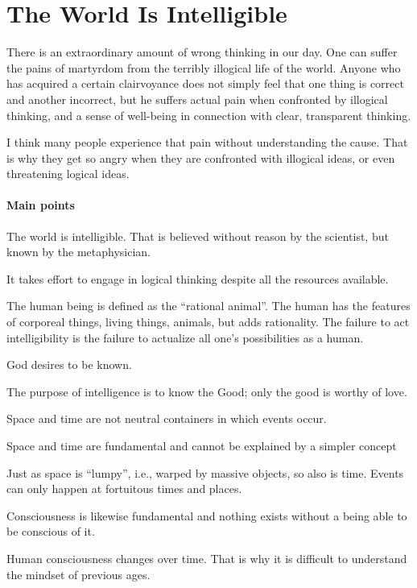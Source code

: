 \section{The World Is Intelligible}

\begin{quotex}
There is an extraordinary amount of wrong thinking in our day. One can suffer the pains of martyrdom from the terribly illogical life of the world. Anyone who has acquired a certain clairvoyance does not simply feel that one thing is correct and another incorrect, but he suffers actual pain when confronted by illogical thinking, and a sense of well-being in connection with clear, transparent thinking.
\end{quotex}

I think many people experience that pain without understanding the cause. That is why they get so angry when they are confronted with illogical ideas, or even threatening logical ideas.

\paragraph{Main points}

The world is intelligible. That is believed without reason by the scientist, but known by the metaphysician.

It takes effort to engage in logical thinking despite all the resources available.

The human being is defined as the ``rational animal''. The human has the features of corporeal things, living things, animals, but adds rationality. The failure to act intelligibility is the failure to actualize all one's possibilities as a human.

God desires to be known.

The purpose of intelligence is to know the Good; only the good is worthy of love.

Space and time are not neutral containers in which events occur.

Space and time are fundamental and cannot be explained by a simpler concept

Just as space is ``lumpy'', i.e., warped by massive objects, so also is time. Events can only happen at fortuitous times and places.

Consciousness is likewise fundamental and nothing exists without a being able to be conscious of it.

Human consciousness changes over time. That is why it is difficult to understand the mindset of previous ages.

